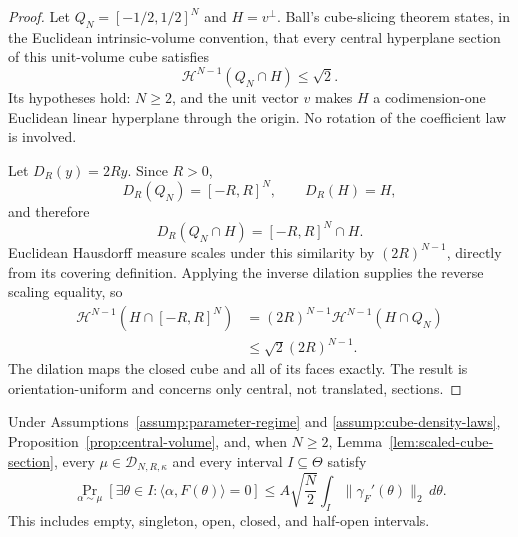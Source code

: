\begin{proof}
Let $Q_N=[-1/2,1/2]^N$ and $H=v^\perp$.  Ball's cube-slicing theorem
\citep{ball1986cube} states, in the Euclidean intrinsic-volume convention,
that every central hyperplane section of this unit-volume cube satisfies
\[
\mathcal H^{N-1}(Q_N\cap H)\leq\sqrt2.
\tag{A.7}
\]
Its hypotheses hold: $N\geq2$, and the unit vector $v$ makes $H$ a
codimension-one Euclidean linear hyperplane through the origin.  No rotation
of the coefficient law is involved.

Let $D_R(y)=2Ry$.  Since $R>0$,
\[
D_R(Q_N)=[-R,R]^N,
\qquad
D_R(H)=H,
\]
and therefore
\[
D_R(Q_N\cap H)=[-R,R]^N\cap H.
\]
Euclidean Hausdorff measure scales under this similarity by
$(2R)^{N-1}$, directly from its covering definition.  Applying the inverse
dilation supplies the reverse scaling equality, so
\[
\begin{aligned}
\mathcal H^{N-1}(H\cap[-R,R]^N)
&=(2R)^{N-1}\mathcal H^{N-1}(H\cap Q_N)\\
&\leq\sqrt2(2R)^{N-1}.
\end{aligned}
\]
The dilation maps the closed cube and all of its faces exactly.  The result
is orientation-uniform and concerns only central, not translated, sections.
\end{proof}

\begin{proposition}
\label{prop:central-sweep}
Under Assumptions~\ref{assump:parameter-regime} and
\ref{assump:cube-density-laws}, Proposition~\ref{prop:central-volume}, and,
when $N\geq2$, Lemma~\ref{lem:scaled-cube-section}, every
$\mu\in\mathcal D_{N,R,\kappa}$ and every interval $I\subseteq\Theta$
satisfy
\[
\Pr_{\alpha\sim\mu}
[\exists\theta\in I:\langle\alpha,F(\theta)\rangle=0]
\leq A\sqrt{\frac N2}
\int_I\|\gamma_F'(\theta)\|_2\,d\theta.
\tag{A.8}
\]
This includes empty, singleton, open, closed, and half-open intervals.
\end{proposition}

